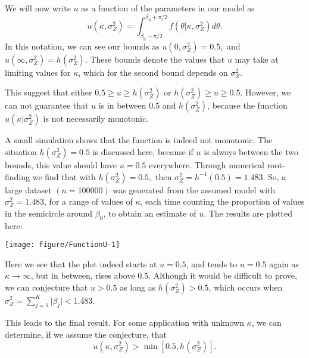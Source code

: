 \documentclass[12pt,a4paper]{article}\usepackage[]{graphicx}\usepackage[]{color}
\makeatletter
\def\maxwidth{ %
  \ifdim\Gin@nat@width>\linewidth
    \linewidth
  \else
    \Gin@nat@width
  \fi
}
\newenvironment{knitrout}{}{} %
\makeatother
\begin{document}
We will now write $u$ as a function of the parameters in our model as
$$ u(\kappa, \sigma^2_Z) = \int_{\beta_0 - \pi / 2}^{\beta_0 + \pi / 2} f(\theta \vert \kappa, \sigma^2_Z) d \theta.$$
In this notation, we can see our bounds as $u(0, \sigma^2_Z) = 0.5,$ and $u(\infty, \sigma^2_Z) = h\left(\sigma^2_Z \right).$ These bounds denote the values that $u$ may take at limiting values for $\kappa$, which for the second bound depends on $\sigma^2_Z$.

This suggest that either $0.5 \geq u \geq h\left(\sigma^2_Z \right)$ or $ h\left(\sigma^2_Z \right) \geq u \geq 0.5$. However, we can not guarantee that $u$ is in between $0.5$ and $h\left(\sigma^2_Z \right)$, because the function $u(\kappa \vert \sigma^2_Z)$ is not necessarily monotonic.

A small simulation shows that the function is indeed not monotonic. The situation $h\left(\sigma^2_Z \right) = 0.5$ is discussed here, because if $u$ is always between the two bounds, this value should have $u = 0.5$ everywhere. Through numerical root-finding we find that with $h\left(\sigma^2_Z \right) = 0.5,$ then $\sigma^2_Z = h^{-1}(0.5) = 1.483$. So, a large dataset $(n = 100 000)$ was generated from the assumed model with $\sigma^2_Z = 1.483$, for a range of values of $\kappa$, each time counting the proportion of values in the semicircle around $\beta_0$, to obtain an estimate of $u$. The results are plotted here:

\begin{knitrout}
\color{fgcolor}

{\centering \texttt{[image: figure/FunctionU-1]} 

}



\end{knitrout}
%
Here we see that the plot indeed starts at $u=0.5$, and tends to $u=0.5$ again as $\kappa \to \infty$, but in between, rises above $0.5$. Although it would be difficult to prove, we can conjecture that $u > 0.5$ as long as $h\left(\sigma^2_Z \right) > 0.5$, which occurs when $\sigma^2_Z = \sum_{j=1}^{K} \vert \beta_j \vert < 1.483.$

This leads to the final result. For some application with unknown $\kappa$, we can determine, if we assume the conjecture, that
\begin{equation}
u(\kappa, \sigma^2_Z) > \min \left[ 0.5, h\left(\sigma^2_Z\right) \right].
\end{equation}
\end{document}
